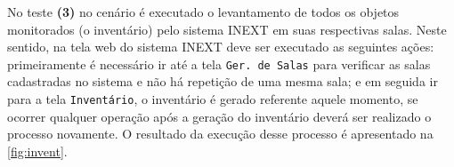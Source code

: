 \begin{figure}[ht]
              \hspace{0.5cm}
\end{figure}

No teste \textbf{(3)} no cenário é executado o levantamento de todos os objetos monitorados (o inventário) pelo sistema INEXT em suas respectivas salas. Neste sentido, na tela web do sistema INEXT deve ser executado as seguintes ações: primeiramente é necessário ir até a tela \texttt{Ger. de Salas} para verificar as salas cadastradas no sistema e não há repetição de uma mesma sala; e em seguida ir para a tela \texttt{Inventário}, o inventário é gerado referente aquele momento, se ocorrer qualquer operação após a geração do inventário deverá ser realizado o processo novamente. O resultado da execução desse processo é apresentado na \autoref{fig:invent}.



